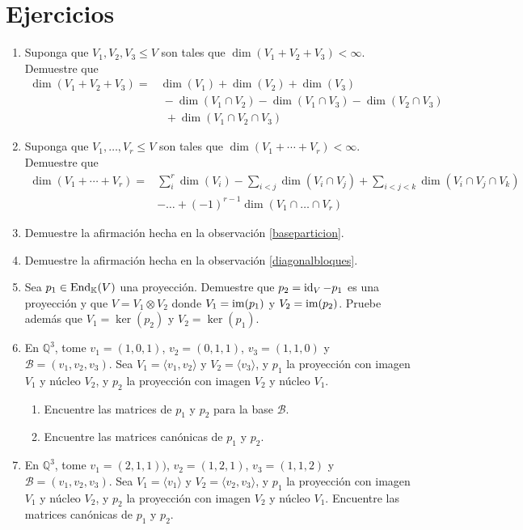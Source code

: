 \section*{Ejercicios}
\begin{enumerate}
  \item Suponga que $V_1,V_2,V_3\le V$ son tales que $\dim(V_1+V_2+V_3)< \infty$. Demuestre que
  \begin{align*}
    \dim(V_1+V_2+V_3) = & \dim(V_1)+\dim(V_2)+\dim(V_3)\\
      & \ -\dim(V_1\cap V_2)-\dim(V_1\cap V_3)-\dim(V_2\cap V_3)\\
      & \ \ +\dim(V_1\cap V_2\cap V_3)
  \end{align*}
  \item Suponga que $V_1,\ldots,V_r\le V$ son tales que $\dim(V_1+\cdots+V_r)< \infty$. Demuestre que
  \begin{align*}
    \dim(V_1+\cdots+V_r) = & \sum_{i}^r\dim(V_i)-\sum_{i<j}\dim(V_i\cap V_j)+\sum_{i<j<k}\dim(V_i\cap V_j\cap V_k)\\
      & -\ldots+(-1)^{r-1}\dim(V_1\cap \ldots\cap V_r)
  \end{align*}
  \item Demuestre la afirmación hecha en la observación \ref{baseparticion}.
  \item Demuestre la afirmación hecha en la observación \ref{diagonalbloques}.
  \item Sea $p_1\in\operatorname{End}_\mathbb{K}(V)$ una proyección. Demuestre que $p_2=\operatorname{id}_V-p_1$ es una proyección y que $V=V_1\otimes V_2$ donde $V_1=\operatorname{im}(p_1)$ y $V_2=\operatorname{im}(p_2)$. Pruebe además que $V_1=\ker(p_2)$ y $V_2=\ker(p_1)$.
  \item En $\mathbb{Q}^3$, tome $v_1=(1,0,1)$, $v_2=(0,1,1)$, $v_3=(1,1,0)$ y $\mathcal{B}=(v_1,v_2,v_3)$. Sea $V_1=\langle v_1,v_2\rangle$ y $V_2=\langle v_3\rangle$, y $p_1$ la proyección con imagen $V_1$ y núcleo $V_2$, y $p_2$ la proyección con imagen $V_2$ y núcleo $V_1$. 
    \begin{enumerate}
      \item Encuentre las matrices de $p_1$ y $p_2$ para la base $\mathcal{B}$.
      \item Encuentre las matrices canónicas de $p_1$ y $p_2$.
    \end{enumerate}
  \item En $\mathbb{Q}^3$, tome $v_1=(2,1,1))$, $v_2=(1,2,1)$, $v_3=(1,1,2)$ y $\mathcal{B}=(v_1,v_2,v_3)$. Sea $V_1=\langle v_1\rangle$ y $V_2=\langle v_2,v_3\rangle$, y $p_1$ la proyección con imagen $V_1$ y núcleo $V_2$, y $p_2$ la proyección con imagen $V_2$ y núcleo $V_1$. Encuentre las matrices canónicas de $p_1$ y $p_2$.

\end{enumerate}
